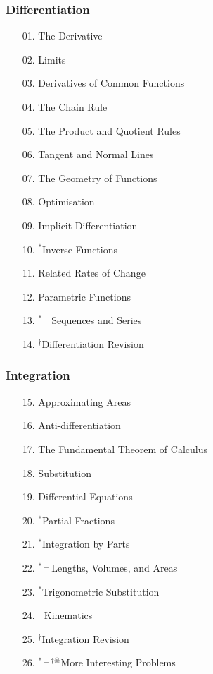 \begin{multicols}{2}
\subsubsection*{Differentiation}
\begin{enumerate}
  \item[01.] The Derivative
  \item[02.] Limits
  \item[03.] Derivatives of Common Functions
  \item[04.] The Chain Rule
  \item[05.] The Product and Quotient Rules
  \item[06.] Tangent and Normal Lines
  \item[07.] The Geometry of Functions
  \item[08.] Optimisation
  \item[09.] Implicit Differentiation
  \item[10.] $^*$Inverse Functions
  \item[11.] Related Rates of Change
  \item[12.] Parametric Functions
  \item[13.] $^{*\perp}$Sequences and Series
  \item[14.] $^\dagger$Differentiation Revision
\end{enumerate}

\subsubsection*{Integration}
\begin{enumerate}
  \item[15.] Approximating Areas
  \item[16.] Anti-differentiation
  \item[17.] The Fundamental Theorem of Calculus
  \item[18.] Substitution
  \item[19.] Differential Equations
  \item[20.] $^*$Partial Fractions
  \item[21.] $^*$Integration by Parts
  \item[22.] $^{*\perp}$Lengths, Volumes, and Areas
  \item[23.] $^*$Trigonometric Substitution
  \item[24.] $^\perp$Kinematics
  \item[25.] $^\dagger$Integration Revision
  \item[26.] $^{*\perp\dagger\skull}$More Interesting Problems
\end{enumerate}
\end{multicols}

